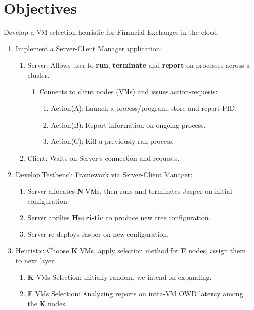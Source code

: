 \documentclass{article}
\begin{document}
\section{Objectives}
Develop a VM selection heuristic for Financial Exchanges in the cloud.
\begin{enumerate}
    \item Implement a Server-Client Manager application:
    \begin{enumerate}
        \item Server: Allows user to \textbf{run}, \textbf{terminate} and \textbf{report} on processes across a cluster.        
        \begin{enumerate}
            \item Connects to client nodes (VMs) and issues action-requests:
            \begin{enumerate}
                \item Action(A): Launch a process/program, store and report PID.
                \item Action(B): Report information on ongoing process.
                \item Action(C): Kill a previously ran process.
            \end{enumerate}
        \end{enumerate}
        \item Client: Waits on Server's connection and requests.
    \end{enumerate}
    \item Develop Testbench Framework via Server-Client Manager:
    \begin{enumerate}
        \item Server allocates \textbf{N} VMs, then runs and terminates Jasper on initial configuration.
        \item Server applies \textbf{Heuristic} to produce new tree configuration.
        \item Server re-deploys Jasper on new configuration.
    \end{enumerate}
    \item Heuristic: Choose \textbf{K} VMs, apply selection method for \textbf{F} nodes, assign them to next layer.
        \begin{enumerate}
            \item \textbf{K} VMs Selection: Initially random, we intend on expanding.
            \item \textbf{F} VMs Selection: Analyzing reports on intra-VM OWD latency among the \textbf{K} nodes.
        \end{enumerate}
\end{enumerate}
\end{document}
